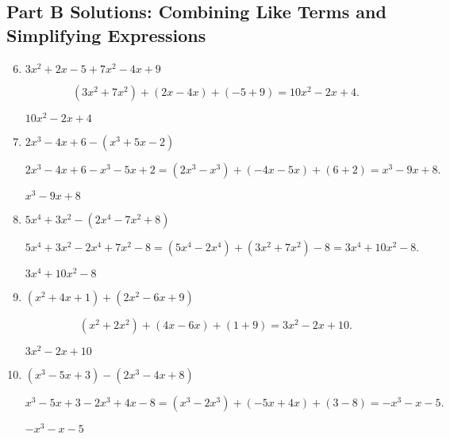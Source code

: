 \documentclass[12pt]{article}
\begin{document}
\subsection*{Part B Solutions: Combining Like Terms and Simplifying Expressions}
\begin{enumerate}
  \setcounter{enumi}{5}
  \item \(3x^2 + 2x - 5 + 7x^2 - 4x + 9\)

  \[
  (3x^2 + 7x^2) + (2x - 4x) + (-5 + 9)
  = 10x^2 - 2x + 4.
  \]

  \(\boxed{10x^2 - 2x + 4}\)

  \item \(2x^3 - 4x + 6 - (x^3 + 5x - 2)\)

  \[
  2x^3 - 4x + 6 - x^3 - 5x + 2
  = (2x^3 - x^3) + (-4x - 5x) + (6 + 2)
  = x^3 - 9x + 8.
  \]

  \(\boxed{x^3 - 9x + 8}\)

  \item \(5x^4 + 3x^2 - (2x^4 - 7x^2 + 8)\)

  \[
  5x^4 + 3x^2 - 2x^4 + 7x^2 - 8
  = (5x^4 - 2x^4) + (3x^2 + 7x^2) - 8
  = 3x^4 + 10x^2 - 8.
  \]

  \(\boxed{3x^4 + 10x^2 - 8}\)

  \item \((x^2 + 4x + 1) + (2x^2 - 6x + 9)\)

  \[
  (x^2 + 2x^2) + (4x - 6x) + (1 + 9)
  = 3x^2 - 2x + 10.
  \]

  \(\boxed{3x^2 - 2x + 10}\)

  \item \((x^3 - 5x + 3) - (2x^3 - 4x + 8)\)

  \[
  x^3 - 5x + 3 - 2x^3 + 4x - 8
  = (x^3 - 2x^3) + (-5x + 4x) + (3 - 8)
  = -x^3 - x - 5.
  \]

  \(\boxed{-x^3 - x - 5}\)
\end{enumerate}
\end{document}
